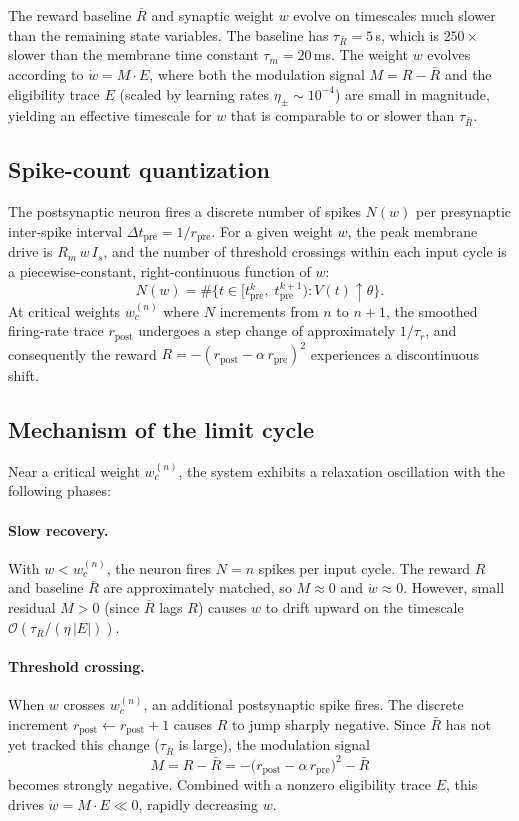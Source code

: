 \documentclass[11pt]{article}
\theoremstyle{plain}
\theoremstyle{definition}
\begin{document}
The reward baseline $\bar{R}$ and synaptic weight $w$ evolve on timescales much slower than the remaining state variables. The baseline has $\tau_{\bar{R}} = 5$\,s, which is $250\times$ slower than the membrane time constant $\tau_m = 20$\,ms. The weight $w$ evolves according to $\dot{w} = M \cdot E$, where both the modulation signal $M = R - \bar{R}$ and the eligibility trace $E$ (scaled by learning rates $\eta_\pm \sim 10^{-4}$) are small in magnitude, yielding an effective timescale for $w$ that is comparable to or slower than $\tau_{\bar{R}}$.

\subsection{Spike-count quantization}

The postsynaptic neuron fires a discrete number of spikes $N(w)$ per presynaptic inter-spike interval $\Delta t_{\mathrm{pre}} = 1/r_{\mathrm{pre}}$. For a given weight $w$, the peak membrane drive is $R_m\, w\, I_s$, and the number of threshold crossings within each input cycle is a piecewise-constant, right-continuous function of $w$:
\[
    N(w) = \#\bigl\{t \in [t_{\mathrm{pre}}^k,\; t_{\mathrm{pre}}^{k+1}) : V(t) \uparrow \theta \bigr\}.
\]
At critical weights $w_c^{(n)}$ where $N$ increments from $n$ to $n+1$, the smoothed firing-rate trace $r_{\mathrm{post}}$ undergoes a step change of approximately $1/\tau_r$, and consequently the reward $R = -(r_{\mathrm{post}} - \alpha\, r_{\mathrm{pre}})^2$ experiences a discontinuous shift.

\subsection{Mechanism of the limit cycle}

Near a critical weight $w_c^{(n)}$, the system exhibits a relaxation oscillation with the following phases:

\paragraph{Slow recovery.} With $w < w_c^{(n)}$, the neuron fires $N = n$ spikes per input cycle. The reward $R$ and baseline $\bar{R}$ are approximately matched, so $M \approx 0$ and $\dot{w} \approx 0$. However, small residual $M > 0$ (since $\bar{R}$ lags $R$) causes $w$ to drift upward on the timescale $\mathcal{O}(\tau_{\bar{R}} / (\eta\, |E|))$.

\paragraph{Threshold crossing.} When $w$ crosses $w_c^{(n)}$, an additional postsynaptic spike fires. The discrete increment $r_{\mathrm{post}} \leftarrow r_{\mathrm{post}} + 1$ causes $R$ to jump sharply negative. Since $\bar{R}$ has not yet tracked this change ($\tau_{\bar{R}}$ is large), the modulation signal
\[
    M = R - \bar{R} = -\bigl(r_{\mathrm{post}} - \alpha\, r_{\mathrm{pre}}\bigr)^2 - \bar{R}
\]
becomes strongly negative. Combined with a nonzero eligibility trace $E$, this drives $\dot{w} = M \cdot E \ll 0$, rapidly decreasing $w$.
\end{document}
